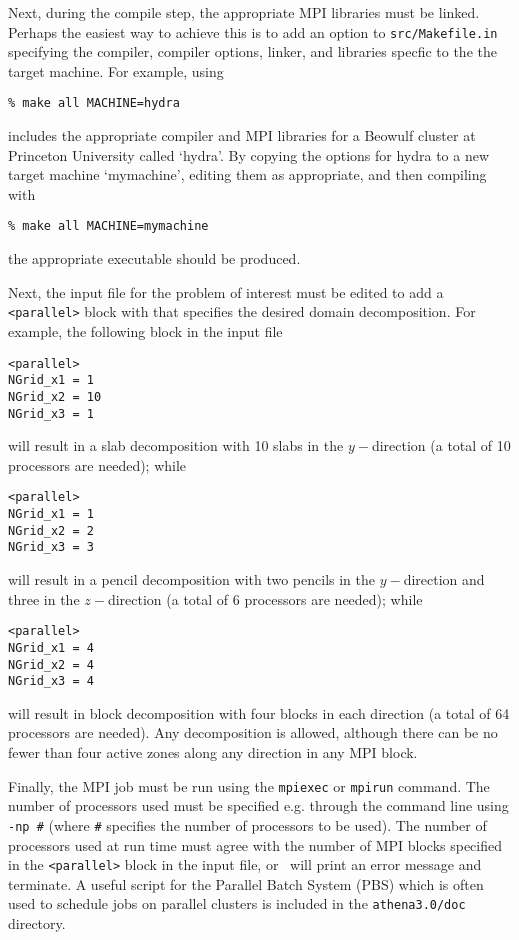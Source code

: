 Next, during the compile step, the appropriate MPI libraries must be
linked.  Perhaps the easiest way to achieve this is to add an option
to {\tt src/Makefile.in} specifying the compiler, compiler options, linker,
and libraries specfic to the the target machine.  For example, using
\begin{verbatim}
% make all MACHINE=hydra
\end{verbatim}
includes the appropriate compiler and MPI libraries for a Beowulf cluster
at Princeton University called `hydra'.  By copying the options for hydra
to a new target machine `mymachine', editing them as appropriate, and
then compiling with
\begin{verbatim}
% make all MACHINE=mymachine
\end{verbatim}
the appropriate executable should be produced.

Next, the input file for the problem of interest must be edited to add
a {\tt <parallel>} block with that specifies the desired domain decomposition.
For example, the following block in the input file
\begin{verbatim}
<parallel>
NGrid_x1 = 1
NGrid_x2 = 10
NGrid_x3 = 1
\end{verbatim}
will result in a slab decomposition with 10 slabs in the $y-$direction
(a total of 10 processors are needed); while
\begin{verbatim}
<parallel>
NGrid_x1 = 1
NGrid_x2 = 2
NGrid_x3 = 3
\end{verbatim}
will result in a pencil decomposition with two pencils in the $y-$direction and
three in the $z-$direction (a total of 6 processors are needed); while
\begin{verbatim}
<parallel>
NGrid_x1 = 4
NGrid_x2 = 4
NGrid_x3 = 4
\end{verbatim}
will result in block decomposition with four blocks in each direction
(a total of 64 processors are needed).  Any decomposition is allowed,
although there can be no fewer than four active zones along any direction
in any MPI block.

Finally, the MPI job must be run using the {\tt mpiexec} or {\tt mpirun}
command.  The number of processors used must be specified e.g. through the
command line using {\tt -np \#} (where {\tt \#} specifies the number of
processors to be used).  The number of processors used at run time must
agree with the number of MPI blocks specified in the {\tt <parallel>}
block in the input file, or \ath\ will print an error message and
terminate.  A useful script for the Parallel Batch System (PBS) which
is often used to schedule jobs on parallel clusters is included in the
{\tt athena3.0/doc} directory.

